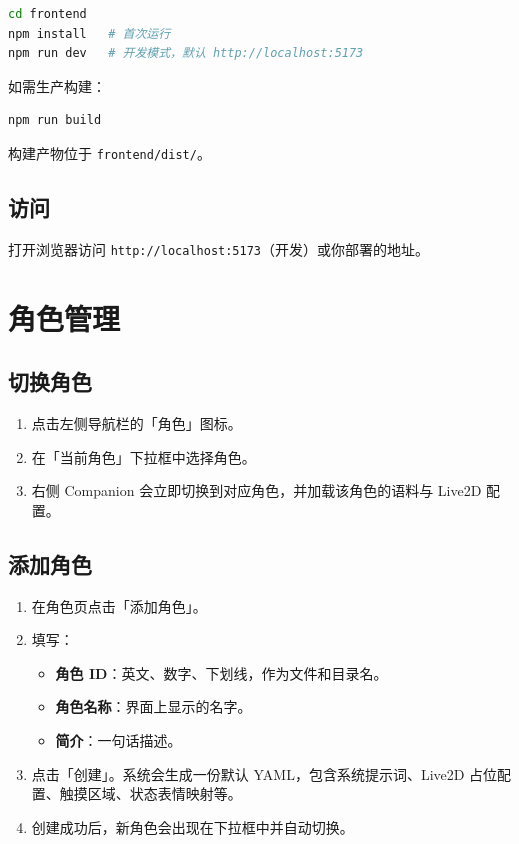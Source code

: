 \documentclass[12pt,a4paper]{article}
\begin{document}
\begin{lstlisting}[language=bash]
cd frontend
npm install   # 首次运行
npm run dev   # 开发模式，默认 http://localhost:5173
\end{lstlisting}

如需生产构建：

\begin{lstlisting}[language=bash]
npm run build
\end{lstlisting}

构建产物位于 \texttt{frontend/dist/}。

\subsection{访问}

打开浏览器访问 \texttt{http://localhost:5173}（开发）或你部署的地址。

\section{角色管理}

\subsection{切换角色}

\begin{enumerate}
  \item 点击左侧导航栏的「角色」图标。
  \item 在「当前角色」下拉框中选择角色。
  \item 右侧 Companion 会立即切换到对应角色，并加载该角色的语料与 Live2D 配置。
\end{enumerate}

\subsection{添加角色}

\begin{enumerate}
  \item 在角色页点击「添加角色」。
  \item 填写：
  \begin{itemize}
    \item \textbf{角色 ID}：英文、数字、下划线，作为文件和目录名。
    \item \textbf{角色名称}：界面上显示的名字。
    \item \textbf{简介}：一句话描述。
  \end{itemize}
  \item 点击「创建」。系统会生成一份默认 YAML，包含系统提示词、Live2D 占位配置、触摸区域、状态表情映射等。
  \item 创建成功后，新角色会出现在下拉框中并自动切换。
\end{enumerate}
\end{document}
